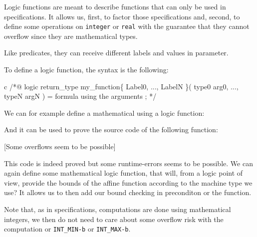 Logic functions are meant to describe functions that can only be used in
specifications. It allows us, first, to factor those specifications and,
second, to define some operations on \texttt{integer} or \texttt{real}
with the guarantee that they cannot overflow since they are mathematical
types.

Like predicates, they can receive different labels and values in
parameter.





To define a logic function, the syntax is the following:



\begin{CodeBlock}{c}
/*@
  logic return_type my_function\{ Label0, ..., LabelN \}( type0 arg0, ..., typeN argN ) =
    formula using the arguments ;
*/
\end{CodeBlock}



We can for example define a mathematical  using a logic function:






And it can be used to prove the source code of the following function:






[Some overflows seem to be possible]


This code is indeed proved but some runtime-errors seems to be possible.
We can again define some mathematical logic function, that will, from a
logic point of view, provide the bounds of the affine function according
to the machine type we use? It allows us to then add our bound checking
in preconditon or the function.





\begin{Information}
  Note that, as in specifications, computations are done using mathematical
  integers, we then do not need to care about some overflow risk with the
  computation or \texttt{INT\_MIN-b} or \texttt{INT\_MAX-b}.
\end{Information}


